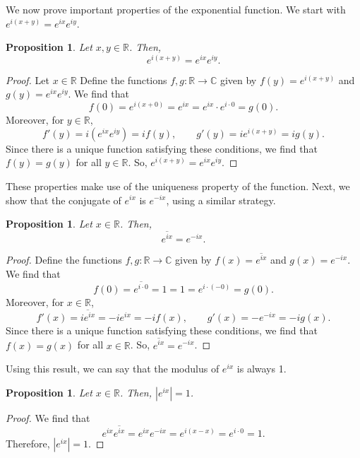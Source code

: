 \documentclass[a4paper, openany]{memoir}
\theoremstyle{definition}
\theoremstyle{plain}
\newtheorem{proposition}[definition]{Proposition}
\begin{document}
We now prove important properties of the exponential function. We start with $e^{i(x + y)} = e^{ix} e^{iy}$.
\begin{proposition}
Let $x, y \in \mathbb{R}$. Then,
\[e^{i(x + y)} = e^{ix} e^{iy}.\]
\end{proposition}
\begin{proof}
Let $x \in \mathbb{R}$ Define the functions $f, g: \mathbb{R} \to \mathbb{C}$ given by $f(y) = e^{i(x+y)}$ and $g(y) = e^{ix} e^{iy}$. We find that
\[f(0) = e^{i(x + 0)} = e^{ix} = e^{ix} \cdot e^{i \cdot 0} = g(0).\]
Moreover, for $y \in \mathbb{R}$,
\[f'(y) = i (e^{ix} e^{iy}) = if(y), \qquad g'(y) = ie^{i(x+y)} = ig(y).\]
Since there is a unique function satisfying these conditions, we find that $f(y) = g(y)$ for all $y \in \mathbb{R}$. So, $e^{i(x+y)} = e^{ix} e^{iy}$.
\end{proof}
\noindent These properties make use of the uniqueness property of the function. Next, we show that the conjugate of $e^{ix}$ is $e^{-ix}$, using a similar strategy.
\begin{proposition}
Let $x \in \mathbb{R}$. Then,
\[\overline{e^{ix}} = e^{-ix}.\]
\end{proposition}
\begin{proof}
Define the functions $f, g: \mathbb{R} \to \mathbb{C}$ given by $f(x) = \overline{e^{ix}}$ and $g(x) = e^{-ix}$. We find that
\[f(0) = \overline{e^{i \cdot 0}} = 1 = 1 = e^{i \cdot (-0)} = g(0).\]
Moreover, for $x \in \mathbb{R}$,
\[f'(x) = \overline{i e^{ix}} = -ie^{ix} = -i f(x), \qquad g'(x) = -e^{-ix} = -i g(x).\]
Since there is a unique function satisfying these conditions, we find that $f(x) = g(x)$ for all $x \in \mathbb{R}$. So, $\overline{e^{ix}} = e^{-ix}$.
\end{proof}
\noindent Using this result, we can say that the modulus of $e^{ix}$ is always 1.
\begin{proposition}
Let $x \in \mathbb{R}$. Then, $|e^{ix}| = 1$.
\end{proposition}
\begin{proof}
We find that
\[e^{ix} \overline{e^{ix}} = e^{ix} e^{-ix} = e^{i(x - x)} = e^{i \cdot 0} = 1.\]
Therefore, $|e^{ix}| = 1$.
\end{proof}
\end{document}
